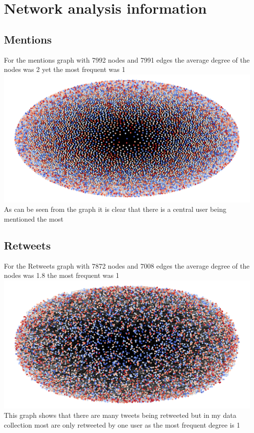 \documentclass[10pt,a4paper]{article}
\begin{document}
	
\section{Network analysis information}	

 	\subsection*{Mentions}
 	For the mentions graph with 7992 nodes and 7991 edges the average degree of the nodes was 2 yet the most frequent was 1
 	\includegraphics[width=\textwidth]{images/mentions_graph.png}
 	As can be seen from the graph it is clear that there is a central user being mentioned the most
 	
 	
 	\subsection*{Retweets}
 	For the Retweets graph with 7872 nodes and 7008 edges the average degree of the nodes was 1.8 the most frequent was 1
 	\includegraphics[width=\textwidth]{images/retweets_graph.png} 
 	This graph shows that there are many tweets being retweeted but in my data collection most are only retweeted by one user as the most frequent degree is 1
\end{document}
